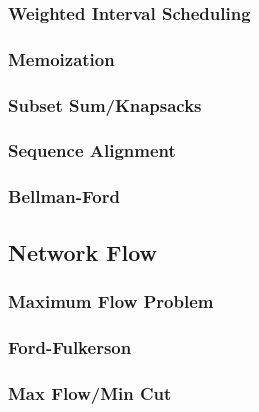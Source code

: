 \documentclass{article}
\begin{document}
\begin{multicols*}{2}
        \subsubsection*{Weighted Interval Scheduling}
        \subsubsection*{Memoization}
        \subsubsection*{Subset Sum/Knapsacks}
        \subsubsection*{Sequence Alignment}
        \subsubsection*{Bellman-Ford}
        \subsection*{Network Flow}
        \subsubsection*{Maximum Flow Problem}
        \subsubsection*{Ford-Fulkerson}
        \subsubsection*{Max Flow/Min Cut}
    \end{multicols*}
\end{document}
